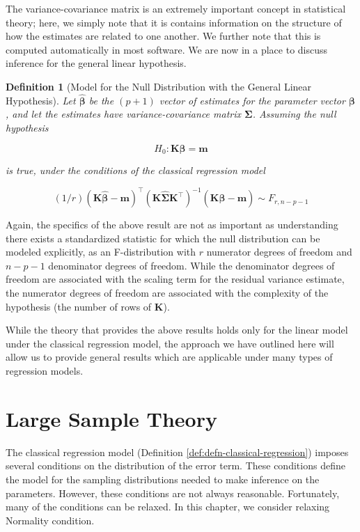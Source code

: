 \documentclass[
]{book}
\theoremstyle{plain}
\theoremstyle{mydefn}
\newtheorem{definition}{Definition}[chapter]
\theoremstyle{myexmpl}
\theoremstyle{remark}
\begin{document}
The variance-covariance matrix is an extremely important concept in statistical theory; here, we simply note that it is contains information on the structure of how the estimates are related to one another. We further note that this is computed automatically in most software. We are now in a place to discuss inference for the general linear hypothesis.

\begin{definition}[Model for the Null Distribution with the General Linear Hypothesis]
Let \(\widehat{\boldsymbol{\beta}}\) be the \((p+1)\) vector of estimates for the parameter vector \(\boldsymbol{\beta}\), and let the estimates have variance-covariance matrix \(\boldsymbol{\Sigma}\). Assuming the null hypothesis

\[H_0: \mathbf{K} \boldsymbol{\beta} = \mathbf{m}\]

is true, under the conditions of the classical regression model

\[(1/r) \left(\mathbf{K}\widehat{\boldsymbol{\beta}} - \mathbf{m}\right)^\top \left(\mathbf{K}\widehat{\boldsymbol{\Sigma}}\mathbf{K}^\top\right)^{-1} \left(\mathbf{K}\widehat{\boldsymbol{\beta}} - \mathbf{m}\right) \sim F_{r, n-p-1}\]
\end{definition}

Again, the specifics of the above result are not as important as understanding there exists a standardized statistic for which the null distribution can be modeled explicitly, as an F-distribution with \(r\) numerator degrees of freedom and \(n-p-1\) denominator degrees of freedom. While the denominator degrees of freedom are associated with the scaling term for the residual variance estimate, the numerator degrees of freedom are associated with the complexity of the hypothesis (the number of rows of \(\mathbf{K}\)).

While the theory that provides the above results holds only for the linear model under the classical regression model, the approach we have outlined here will allow us to provide general results which are applicable under many types of regression models.

\hypertarget{glm-large-sample-theory}{%
\chapter{Large Sample Theory}\label{glm-large-sample-theory}}

The classical regression model (Definition \ref{def:defn-classical-regression}) imposes several conditions on the distribution of the error term. These conditions define the model for the sampling distributions needed to make inference on the parameters. However, these conditions are not always reasonable. Fortunately, many of the conditions can be relaxed. In this chapter, we consider relaxing Normality condition.
\end{document}
